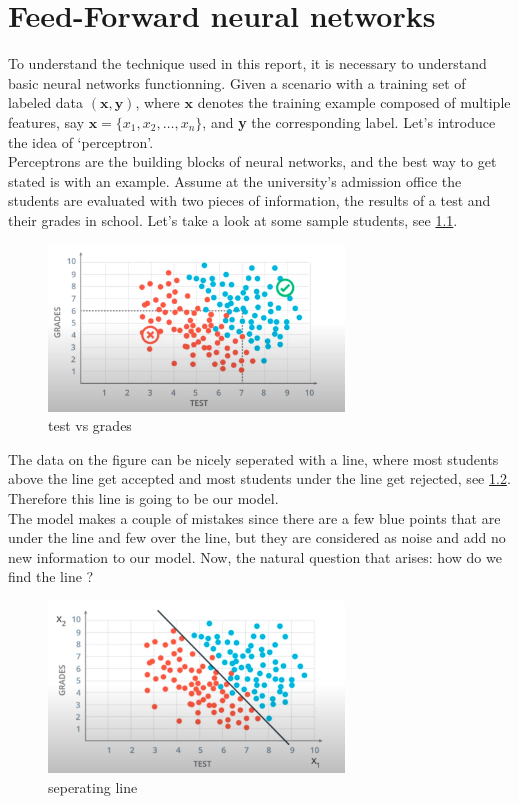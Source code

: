 \chapter{Feed-Forward neural networks}
To understand the technique used in this report, it is necessary to understand basic neural networks functionning.
Given a scenario with a training set of labeled data $(\textbf{x}, \textbf{y})$, where $\textbf{x}$ denotes the training example
composed of multiple features, say $\textbf{x} = \{x_{1}, x_{2}, \ldots, x_{n}\}$, and \textbf{y} the corresponding label.
Let's introduce the idea of `perceptron'. \\
Perceptrons are the building blocks of neural networks, and the best way to get stated is with an example.
Assume at the university's admission office the students are evaluated with two pieces of information, the results of a test and their grades in school. Let's take a look at some sample students, see \cref{fig:perceptron}.

\begin{figure}[ht]
  \centering
  \includegraphics[width=0.7\textwidth]{figs/fig1.png}
  \caption{test vs grades }\label{fig:perceptron}
\end{figure}

The data on the figure can be nicely seperated with a line, where most students above the line get accepted and most students under the line get rejected, see \cref{fig:line}. Therefore this line is going to be our model. \\
The model makes a couple of mistakes since there are a few blue points that are under the line and few over the line, but they are considered as noise and add no new information to our model. Now, the natural question that arises: how do we find the line ?

\begin{figure}[htbp]
  \centering
  \includegraphics[width=0.7\textwidth]{figs/fig2.png}
  \caption{seperating line}\label{fig:line}
\end{figure}

